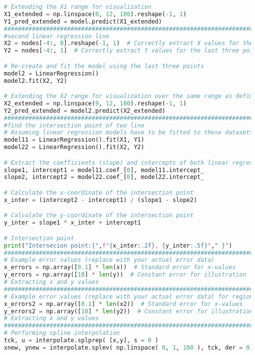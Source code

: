 \documentclass[a4paper,11pt]{article}
\begin{document}
\begin{lstlisting}[language=Python]
# Extending the X1 range for visualization
X1_extended = np.linspace(0, 12, 100).reshape(-1, 1)
Y1_pred_extended = model.predict(X1_extended)
#############################################################################
#second linear regression line
X2 = nodes[-4:, 0].reshape(-1, 1)  # Correctly extract X values for the last three points
Y2 = nodes[-4:, 1]  # Correctly extract Y values for the last three points

# Re-create and fit the model using the last three points
model2 = LinearRegression()
model2.fit(X2, Y2)

# Extending the X2 range for visualization over the same range as defined earlier
X2_extended = np.linspace(9, 12, 100).reshape(-1, 1)
Y2_pred_extended = model2.predict(X2_extended)
#############################################################################
#find the intersection point of two line
# Assuming linear regression models have to be fitted to these datasets
model11 = LinearRegression().fit(X1, Y1)
model22 = LinearRegression().fit(X2, Y2)

# Extract the coefficients (slope) and intercepts of both linear regression models
slope1, intercept1 = model11.coef_[0], model11.intercept_
slope2, intercept2 = model22.coef_[0], model22.intercept_

# Calculate the x-coordinate of the intersection point
x_inter = (intercept2 - intercept1) / (slope1 - slope2)

# Calculate the y-coordinate of the intersection point
y_inter = slope1 * x_inter + intercept1

# Intersection point
print("Intersecion point:{",f"{x_inter:.2f}, {y_inter:.5f}"," }")
############################################################################
# Example error values (replace with your actual error data)
x_errors = np.array([0.1] * len(x))  # Standard error for x-values
y_errors = np.array([10] * len(y))  # Constant error for illustration
# Extracting x and y values
############################################################################
# Example error values (replace with your actual error data) for region of interest
x_errors2 = np.array([0.1] * len(x2))  # Standard error for x-values
y_errors2 = np.array([10] * len(y2))  # Constant error for illustration
# Extracting x and y values
############################################################################
# Performing spline interpolation
tck, u = interpolate.splprep( [x,y], s = 0 )
xnew, ynew = interpolate.splev( np.linspace( 0, 1, 100 ), tck, der = 0)


\end{lstlisting}
\end{document}
